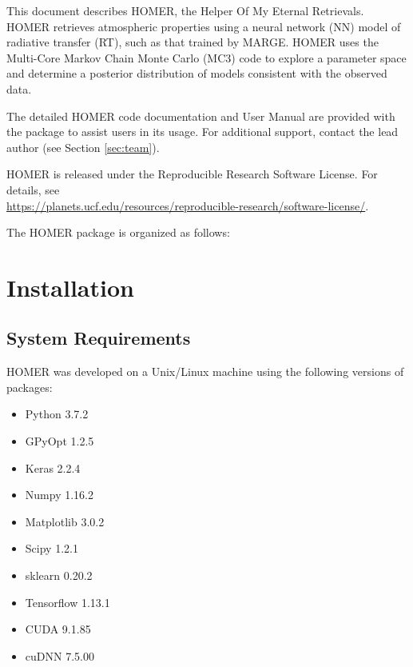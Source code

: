\documentclass[letterpaper, 12pt]{article}
\begin{document}
\noindent This document describes HOMER, the Helper Of My Eternal Retrievals.
HOMER retrieves atmospheric properties using a neural network (NN) model of 
radiative transfer (RT), such as that trained by MARGE.  HOMER uses the 
Multi-Core Markov Chain Monte Carlo (MC3) code to explore a parameter space 
and determine a posterior distribution of models consistent with the observed 
data.

The detailed HOMER code documentation and User Manual are provided 
with the package to assist users in its usage. For additional support, contact 
the lead author (see Section \ref{sec:team}).

HOMER is released under the Reproducible Research Software License.  
For details, see \\
\href{https://planets.ucf.edu/resources/reproducible-research/software-license/}{https://planets.ucf.edu/resources/reproducible-research/software-license/}.
\newline

\noindent The HOMER package is organized as follows: \newline
\noindent{}
\vspace{0.7cm}

\section{Installation}
\label{sec:installation}

\subsection{System Requirements}
\label{sec:requirements}

\noindent HOMER was developed on a Unix/Linux machine using the following 
versions of packages:

\begin{itemize}
\item Python 3.7.2
\item GPyOpt 1.2.5
\item Keras 2.2.4
\item Numpy 1.16.2
\item Matplotlib 3.0.2
\item Scipy 1.2.1
\item sklearn 0.20.2
\item Tensorflow 1.13.1
\item CUDA 9.1.85
\item cuDNN 7.5.00
\end{itemize}
\end{document}
